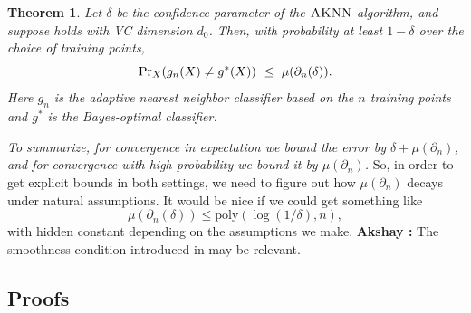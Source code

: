 \documentclass{article}
\def\pr{{\rm Pr}}
\def\X{{\mathcal X}}
\newcommand{\algname}{\textsc{AKNN}}
\newtheorem{theorem}{Theorem}
\newcommand{\comment}[3]{{\color{#1} {\bf #2 :} #3}}
\newcommand{\akshay}[1]{\comment{blue}{Akshay}{#1}}
\begin{document}
\begin{theorem}\label{thm:fastrate2}
Let $\delta$ be the confidence parameter of the $\algname$ algorithm, and suppose  holds with VC dimension $d_0$.
Then, with probability at least $1-\delta$ over the choice of training points,
\[ \pr_{X}(g_n(X) \neq g^*(X)) \ \leq \ \mu(\partial_n (\delta)) .\]
Here $g_n$ is the adaptive nearest neighbor classifier based on the $n$ training points and $g^*$ is the Bayes-optimal classifier. 
\end{theorem}



{\it To summarize, for convergence in expectation we bound the error by $\delta + \mu(\partial_n)$,
and for convergence with high probability we bound it by $\mu(\partial_n)$.}
So, in order to get explicit bounds in both settings, we need to figure out how $\mu(\partial_n)$ decays under natural assumptions. It would be nice if we could get something like 
\[\mu(\partial_n (\delta)) \leq \mathrm{poly}\left(\log(1/\delta), n\right),
\]
with hidden constant depending on the assumptions we make.
\akshay{The smoothness condition introduced in \cite{ChaudhuriDasgupta2014} may be relevant.}






\subsection{Proofs}
\end{document}
